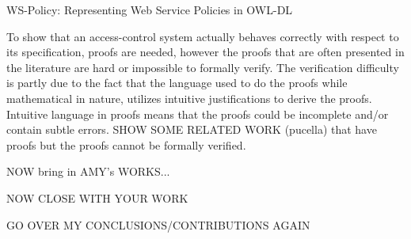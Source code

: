 WS-Policy:
Representing Web Service Policies in OWL-DL

To show that an access-control system actually behaves correctly with respect to its specification, proofs are needed, however the proofs that are often presented in the literature are hard or impossible to formally verify. The verification difficulty is partly due to the fact that the language used to do the proofs while mathematical in nature, utilizes intuitive justifications to derive the proofs. Intuitive language in proofs means that the proofs could be incomplete and/or contain subtle errors. SHOW SOME RELATED WORK (pucella) that have proofs but the proofs cannot be formally verified.


NOW bring in AMY's WORKS...

NOW CLOSE WITH YOUR WORK


GO OVER MY CONCLUSIONS/CONTRIBUTIONS AGAIN





























